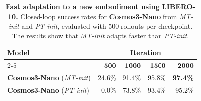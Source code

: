 \begin{table}[H]
    \centering
    \small
    \caption{
        \textbf{Fast adaptation to a new embodiment using LIBERO-10.} Closed-loop success rates for \textbf{Cosmos3-Nano} from \textit{MT-init} and \textit{PT-init}, evaluated with 500 rollouts per checkpoint. The results show that \textit{MT-init} adapts faster than \textit{PT-init}.
    }
    \label{tab:libero_posttraining_success_rate}
    \begin{tabular}{@{}lrrrr@{}}
        \toprule
        \multirow{2}{*}{\textbf{Model}} & \multicolumn{4}{c}{\textbf{Iteration}} \\
        \cmidrule(lr){2-5}
            & \textbf{500} & \textbf{1000} & \textbf{1500} & \textbf{2000} \\
        \midrule
        \textbf{Cosmos3-Nano} (\textit{MT-init}) & 24.6\% & 91.4\% & 95.8\% & \textbf{97.4\%} \\
        \textbf{Cosmos3-Nano} (\textit{PT-init}) & 0.0\% & 73.8\% & 93.4\% & 95.2\% \\
        \bottomrule
    \end{tabular}
\end{table}
